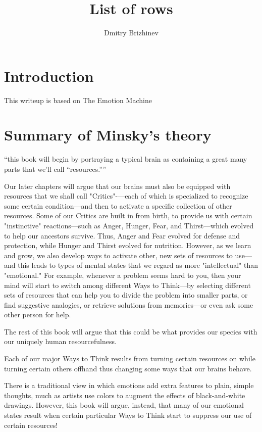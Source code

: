 \documentclass[10pt,a4paper]{article}
\newcommand{\nquote}[1]{``{#1}''}
\begin{document}
\title{\vspace{-10ex}List of rows}
\author{Dmitry Brizhinev}
\maketitle

\section{Introduction}
This writeup is based on The Emotion Machine \cite{minsky}


\section{Summary of Minsky's theory}
\nquote{this book will begin by portraying a typical brain as containing a great many parts that we'll call \nquote{resources.}} \cite[p.~2--3]{minsky}

Our later chapters will argue that our brains must also be equipped with resources that we shall call "Critics"-—each of which is specialized to recognize some certain condition—and then to activate a specific collection of other resources. Some of our Critics are built in from birth, to provide us with certain "instinctive"
reactions—such as Anger, Hunger, Fear, and Thirst—which evolved
to help our ancestors survive. Thus, Anger and Fear evolved for defense and protection, while Hunger and Thirst evolved for nutrition. However, as we learn and grow, we also develop ways to activate other, new sets of resources to use—and this leads to types of mental states that we regard as more "intellectual" than "emotional." For example, whenever a problem seems hard to you, then your mind will start to switch among different Ways to Think—by selecting different sets of resources that can help you to divide the problem into smaller parts, or find suggestive analogies, or retrieve solutions from memories—or even ask some other person
for help. \cite[p.~4]{minsky}

The rest of this book will argue that this could be what provides our species with our uniquely human resourcefulness. \cite[p.~5]{minsky}

Each of our major Ways to Think results from turning certain resources on while turning certain others offhand thus changing some ways that our brains behave. \cite[p.~5]{minsky}

There is a traditional view in which emotions add extra features to plain, simple thoughts, much as artists use colors to augment the effects of black-and-white drawings. However, this book will argue, instead, that many of our emotional states result when certain particular Ways to Think start to suppress our use of certain resources! \cite[p.~5]{minsky}
\end{document}
